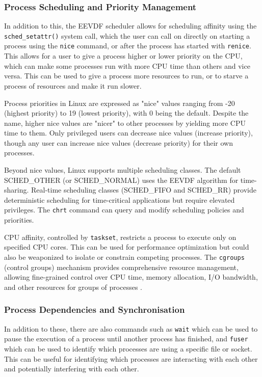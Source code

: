 \subsubsection{Process Scheduling and Priority Management}
\label{ProcessScheduling}

In addition to this, the EEVDF scheduler \parencite[EEVDF]{KernelSchedManual} allows for scheduling affinity using the \texttt{sched\_setattr()} system call, which the user can call on directly on starting a process using the \texttt{nice} command, or after the process has started with \texttt{renice}. This allows for a user to give a process higher or lower priority on the CPU, which can make some processes run with more CPU time than others and vice versa. This can be used to give a process more resources to run, or to starve a process of resources and make it run slower.

Process priorities in Linux are expressed as "nice" values ranging from -20 (highest priority) to 19 (lowest priority), with 0 being the default. Despite the name, higher nice values are "nicer" to other processes by yielding more CPU time to them. Only privileged users can decrease nice values (increase priority), though any user can increase nice values (decrease priority) for their own processes.

Beyond nice values, Linux supports multiple scheduling classes. The default SCHED\_OTHER (or SCHED\_NORMAL) uses the EEVDF algorithm for time-sharing. Real-time scheduling classes (SCHED\_FIFO and SCHED\_RR) provide deterministic scheduling for time-critical applications but require elevated privileges. The \texttt{chrt} command can query and modify scheduling policies and priorities.

CPU affinity, controlled by \texttt{taskset}, restricts a process to execute only on specified CPU cores. This can be used for performance optimization but could also be weaponized to isolate or constrain competing processes. The \texttt{cgroups} (control groups) mechanism provides comprehensive resource management, allowing fine-grained control over CPU time, memory allocation, I/O bandwidth, and other resources for groups of processes \parencite{KernelSchedManual}.

\subsubsection{Process Dependencies and Synchronisation}
\label{ProcessDependencies}

In addition to these, there are also commands such as \texttt{wait} which can be used to pause the execution of a process until another process has finished, and \texttt{fuser} which can be used to identify which processes are using a specific file or socket. This can be useful for identifying which processes are interacting with each other and potentially interfering with each other.

